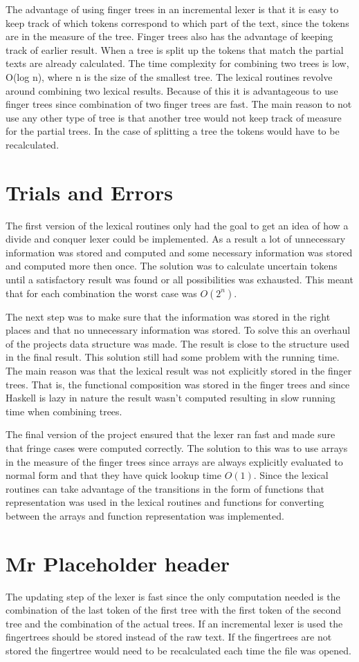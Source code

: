 The advantage of using finger trees in an incremental lexer is that it is easy
to keep track of which tokens correspond to which part of the text, since the
tokens are in the measure of the tree. Finger trees
also has the advantage of keeping track of earlier result. When a tree is split
up the tokens that match the partial texts are already calculated. The time
complexity for combining two trees is low, O(log n), where n is the size of the
smallest tree. The lexical routines revolve around combining two lexical
results. Because of this it is advantageous to use finger trees since combination
of two finger trees are fast. The main reason to not use any other type of tree
is that another tree would not keep track of measure for the partial trees. In
the case of splitting a tree the tokens would have to be recalculated.

\section{Trials and Errors}
The first version of the lexical routines only had the goal to get an idea of
how a divide and conquer lexer could be implemented. As a result a lot of
unnecessary information was stored and computed and some necessary information
was stored and computed more then once. The solution was to calculate
uncertain tokens until a satisfactory result was found or all possibilities was
exhausted. This meant that for each combination the worst case was $O(2^n)$.

The next step was to make sure that the information was stored in the right
places and that no unnecessary information was stored. To solve this an overhaul
of the projects data structure was made. The result is close to the structure
used in the final result. This solution still had some problem with the running
time. The main reason was that the lexical result was not explicitly stored in
the finger trees. That is, the functional composition was stored in the finger
trees and since Haskell is lazy in nature the result wasn't computed resulting
in slow running time when combining trees.

The final version of the project ensured that the lexer ran fast and made
sure that fringe cases were computed correctly. The solution to this was to use
arrays in the measure of the finger trees since arrays are always explicitly
evaluated to normal form and that they have quick lookup time $O(1)$. Since the
lexical routines can take advantage of the transitions in the form of functions
that representation was used in the lexical routines and functions for
converting between the arrays and function representation was implemented.

\section{Mr Placeholder header}
The updating step of the lexer is fast since the only computation needed is the
combination of the last token of the first tree with the first token of the
second tree and the combination of the actual trees. If an incremental lexer is
used the fingertrees should be stored instead of the raw text. If the
fingertrees are not stored the fingertree would need to be recalculated each
time the file was opened.

